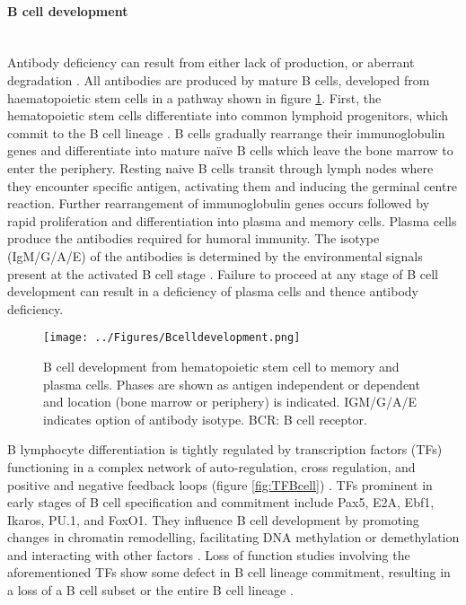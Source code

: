 \documentclass[12pt]{article}
\newcommand{\naive}{na\"{i}ve }
\begin{document}
		\paragraph{B cell development}
			~\\
			Antibody deficiency can result from either lack of production, or aberrant degradation \citep{Fiorilli86}. 
			All antibodies are produced by mature B cells, developed from haematopoietic stem cells in a pathway shown in figure \ref{fig:BCellDevelopment}.
			First, the hematopoietic stem cells differentiate into common lymphoid progenitors, which commit to the B cell lineage \citep{Cooper15}.
			B cells gradually rearrange their immunoglobulin genes and differentiate into mature \naive B cells which leave the bone marrow to enter the periphery. 
			Resting naive B cells transit through lymph nodes where they encounter specific antigen, activating them and inducing the germinal centre reaction. 
			Further rearrangement of immunoglobulin genes occurs followed by rapid proliferation and differentiation into plasma and memory cells. 
			Plasma cells produce the antibodies required for humoral immunity. 
			The isotype (IgM/G/A/E) of the antibodies is determined by the environmental signals present at the activated B cell stage \citep{Pieper13}. 
			Failure to proceed at any stage of B cell development can result in a deficiency of plasma cells and thence antibody deficiency.
			
			
			\begin{figure}[tb]
				\centering
				\texttt{[image: ../Figures/Bcelldevelopment.png]}
				\caption{B cell development from hematopoietic stem cell to memory and plasma cells. Phases are shown as antigen independent or dependent and location (bone marrow or periphery) is indicated. IGM/G/A/E indicates option of antibody isotype. BCR: B cell receptor.}
				\label{fig:BCellDevelopment}
			\end{figure}
			
			B lymphocyte differentiation is tightly regulated by transcription factors (TFs) functioning in a complex network of auto-regulation, cross regulation, and positive and negative feedback loops (figure \ref{fig:TFBcell}) \citep{Choukrallah14,Polansky08,Oakes16,Zan15,Li13,Mercer11,Kulis15,McManus11}.
			TFs prominent in early stages of B cell specification and commitment include Pax5, E2A, Ebf1, Ikaros, PU.1, and FoxO1. 
			They influence B cell development by promoting changes in chromatin remodelling, facilitating DNA methylation or demethylation and interacting with other factors \citep{Gao09,Maier04,Walter08,Decker09,Lin10,McManus11,Treiber10,Zandi00}. 
			Loss of function studies involving the aforementioned TFs show some defect in B cell lineage commitment, resulting in a loss of a B cell subset or the entire B cell lineage \citep{Choukrallah14}.
\end{document}
